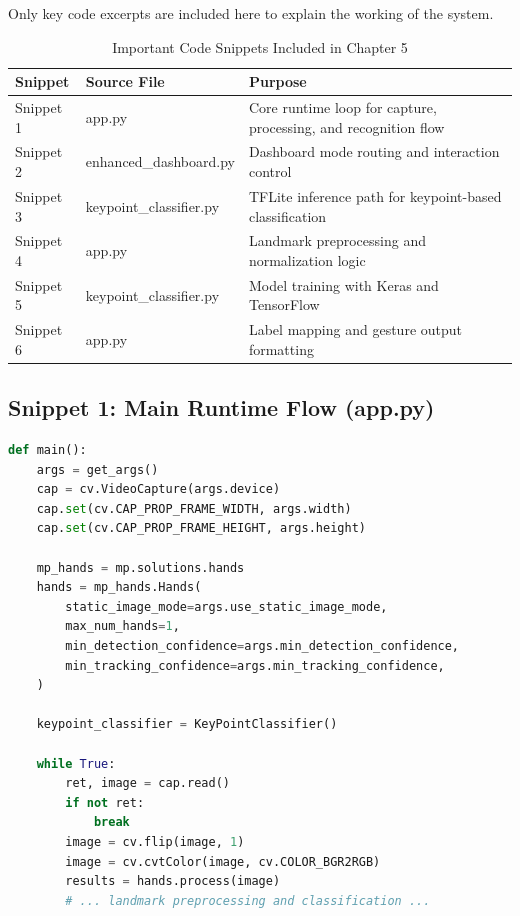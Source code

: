 Only key code excerpts are included here to explain the working of the system.

\begin{table}[H]
\centering
\small
\begin{tabular}{|>{\raggedright\arraybackslash}p{}|>{\raggedright\arraybackslash}p{}|>{\raggedright\arraybackslash}p{}|}
\hline
\textbf{Snippet} & \textbf{Source File} & \textbf{Purpose} \\
\hline
Snippet 1 & app.py & Core runtime loop for capture, processing, and recognition flow \\
\hline
Snippet 2 & enhanced\_dashboard.py & Dashboard mode routing and interaction control \\
\hline
Snippet 3 & keypoint\_classifier.py & TFLite inference path for keypoint-based classification \\
\hline
Snippet 4 & app.py & Landmark preprocessing and normalization logic \\
\hline
Snippet 5 & keypoint\_classifier.py & Model training with Keras and TensorFlow \\
\hline
Snippet 6 & app.py & Label mapping and gesture output formatting \\
\hline
\end{tabular}
\caption{Important Code Snippets Included in Chapter 5}
\end{table}

\subsection{Snippet 1: Main Runtime Flow (app.py)}

\begin{lstlisting}[language=Python]
def main():
    args = get_args()
    cap = cv.VideoCapture(args.device)
    cap.set(cv.CAP_PROP_FRAME_WIDTH, args.width)
    cap.set(cv.CAP_PROP_FRAME_HEIGHT, args.height)

    mp_hands = mp.solutions.hands
    hands = mp_hands.Hands(
        static_image_mode=args.use_static_image_mode,
        max_num_hands=1,
        min_detection_confidence=args.min_detection_confidence,
        min_tracking_confidence=args.min_tracking_confidence,
    )

    keypoint_classifier = KeyPointClassifier()

    while True:
        ret, image = cap.read()
        if not ret:
            break
        image = cv.flip(image, 1)
        image = cv.cvtColor(image, cv.COLOR_BGR2RGB)
        results = hands.process(image)
        # ... landmark preprocessing and classification ...
\end{lstlisting}

